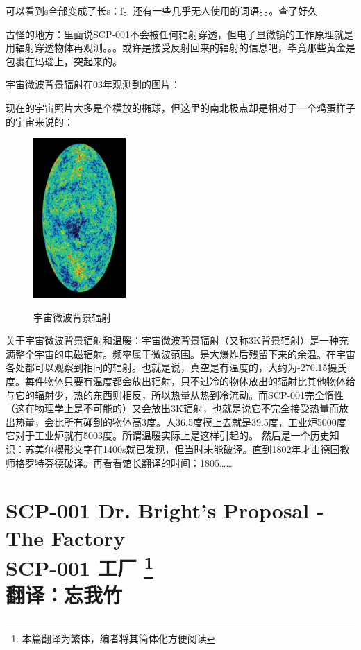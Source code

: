\documentclass[openany,a4paper]{book} %
\newcounter{mychapter} %
\begin{document}
可以看到s全部变成了长s：ſ。还有一些几乎无人使用的词语。。。查了好久

古怪的地方：里面说SCP-001不会被任何辐射穿透，但电子显微镜的工作原理就是用辐射穿透物体再观测。。。或许是接受反射回来的辐射的信息吧，毕竟那些黄金是包裹在玛瑙上，突起来的。

宇宙微波背景辐射在03年观测到的图片：\vspace{12pt}

现在的宇宙照片大多是个横放的椭球，但这里的南北极点却是相对于一个鸡蛋样子的宇宙来说的：
\begin{figure}[H]
  \centering
  \includegraphics[width=100pt]{Pic/SCP-001-4-2.jpg}\\
  \caption{宇宙微波背景辐射}\label{fig:SCP-001-4-2}
\end{figure}

关于宇宙微波背景辐射和温暖：宇宙微波背景辐射（又称3K背景辐射）是一种充满整个宇宙的电磁辐射。频率属于微波范围。是大爆炸后残留下来的余温。在宇宙各处都可以观察到相同的辐射。也就是说，真空是有温度的，大约为-270.15摄氏度。每件物体只要有温度都会放出辐射，只不过冷的物体放出的辐射比其他物体给与它的辐射少，热的东西则相反，所以热量从热到冷流动。而SCP-001完全惰性（这在物理学上是不可能的）又会放出3K辐射，也就是说它不完全接受热量而放出热量，会比所有碰到的物体高3度。人36.5度摸上去就是39.5度，工业炉5000度它对于工业炉就有5003度。所谓温暖实际上是这样引起的。
然后是一个历史知识：苏美尔楔形文字在1400s就已发现，但当时未能破译。直到1802年才由德国教师格罗特芬德破译。再看看馆长翻译的时间：1805……

\addtocounter{mychapter}{1}
\chapter[SCP-001 工厂]{SCP-001 Dr. Bright's Proposal - The Factory \\ SCP-001 工厂 \protect\footnote{本篇翻译为繁体，编者将其简体化方便阅读} \\ 翻译：忘我竹}\label{chap:SCP-001-5}
\end{document}
